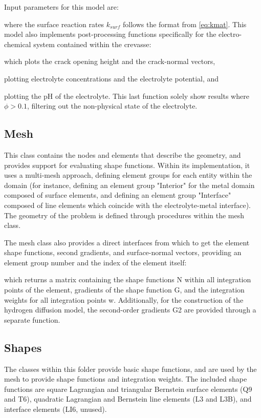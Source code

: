 \documentclass[3p]{elsarticle} %
\begin{document}
Input parameters for this model are:

where the surface reaction rates $k_{surf}$ follows the format from \cref{eq:kmat}. This model also implements post-processing functions specifically for the electro-chemical system contained within the crevasse:

which plots the crack opening height and the crack-normal vectors,

plotting electrolyte concentrations and the electrolyte potential, and

plotting the pH of the electrolyte. This last function solely show results where $\phi>0.1$, filtering out the non-physical state of the electrolyte.

\subsection{Mesh}
This class contains the nodes and elements that describe the geometry, and provides support for evaluating shape functions. Within its implementation, it uses a multi-mesh approach, defining element groups for each entity within the domain (for instance, defining an element group "Interior" for the metal domain composed of surface elements, and defining an element group "Interface" composed of line elements which coincide with the electrolyte-metal interface). The geometry of the problem is defined through procedures within the mesh class.

The mesh class also provides a direct interfaces from which to get the element shape functions, second gradients, and surface-normal vectors, providing an element group number and the index of the element itself:

which returns a matrix containing the shape functions N within all integration points of the element, gradients of the shape function G, and the integration weights for all integration points w. Additionally, for the construction of the hydrogen diffusion model, the second-order gradients G2 are provided through a separate function.

\subsection{Shapes}
The classes within this folder provide basic shape functions, and are used by the mesh to provide shape functions and integration weights. The included shape functions are square Lagrangian and triangular Bernstein surface elements (Q9 and T6), quadratic Lagrangian and Bernstein line elements (L3 and L3B), and interface elements (LI6, unused).
\end{document}
